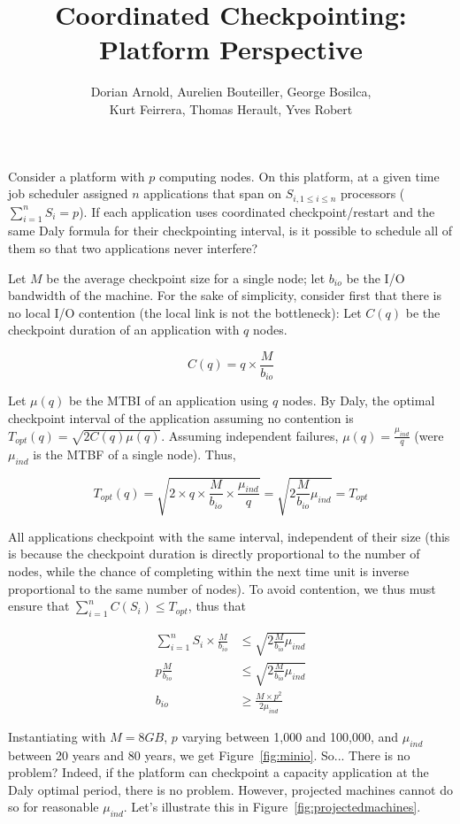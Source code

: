 \documentclass{article}
\author{Dorian Arnold, Aurelien Bouteiller, George Bosilca,\\
 Kurt Feirrera, Thomas Herault, Yves Robert}
\title{Coordinated Checkpointing: Platform Perspective}
\begin{document}
\maketitle

Consider a platform with $p$ computing nodes. On this platform, at a given time job scheduler assigned $n$ applications that span on $S_{i, 1 \leq i \leq n}$ processors ($\sum_{i=1}^{n}S_i = p$). If each application uses coordinated checkpoint/restart and the same Daly formula for their checkpointing interval, is it possible to schedule all of them so that two applications never interfere?

Let $M$ be the average checkpoint size for a single node; let $b_{io}$ be the I/O bandwidth of the machine. For the sake of simplicity, consider first that there is no local I/O contention (the local link is not the bottleneck): Let $C(q)$ be the checkpoint duration of an application with $q$ nodes.

$$C(q) = q\times \frac{M}{b_{io}}$$

Let $\mu(q)$ be the MTBI of an application using $q$ nodes. By Daly, the optimal checkpoint interval of the application assuming no contention is $T_{opt}(q) = \sqrt{2C(q)\mu(q)}$. Assuming independent failures, $\mu(q) = \frac{\mu_{ind}}{q}$ (were $\mu_{ind}$ is the MTBF of a single node). Thus,

$$T_{opt}(q) = \sqrt{2\times q\times \frac{M}{b_{io}} \times \frac{\mu_{ind}}{q}} = \sqrt{2\frac{M}{b_{io}}\mu_{ind}} = T_{opt}$$

All applications checkpoint with the same interval, independent of their size (this is because the checkpoint duration is directly proportional to the number of nodes, while the chance of completing within the next time unit is inverse proportional to the same number of nodes).  To avoid contention, we thus must ensure that $\sum_{i = 1}^{n} C(S_i) \leq T_{opt}$, thus that

$$\begin{array}{rl}
\sum_{i = 1}^{n} S_i\times \frac{M}{b_{io}} & \leq \sqrt{2\frac{M}{b_{io}}\mu_{ind}}\\
p\frac{M}{b_{io}} & \leq \sqrt{2\frac{M}{b_{io}}\mu_{ind}}\\
b_{io} & \geq \frac{M\times p^2}{2\mu_{ind}}
\end{array}$$

Instantiating with $M = 8GB$, $p$ varying between 1,000 and 100,000, and $\mu_{ind}$ between 20 years and 80 years, we get Figure~\ref{fig:minio}. So... There is no problem? Indeed, if the platform can checkpoint a capacity application at the Daly optimal period, there is no problem. However, projected machines cannot do so for reasonable $\mu_{ind}$. Let's illustrate this in Figure~\ref{fig:projectedmachines}.
\end{document}
